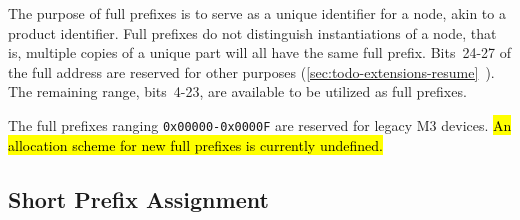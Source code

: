 The purpose of full prefixes is to serve as a unique identifier for a node,
akin to a product identifier. Full prefixes do not distinguish instantiations
of a node, that is, multiple copies of a unique part will all have the same
full prefix. Bits~24-27 of the full address are reserved for other purposes
(\ref{sec:todo-extensions-resume}~). The
remaining range, bits~4-23, are available to be utilized as full prefixes.

The full prefixes ranging {\tt 0x00000-0x0000F} are reserved for legacy M3
devices. \hl{An allocation scheme for new full prefixes is currently
undefined.}

\subsection{Short Prefix Assignment}
\label{sec:addressing-short}
